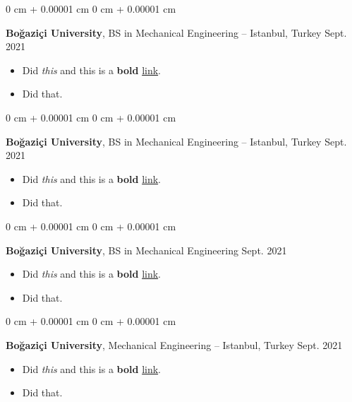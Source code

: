 \documentclass[10pt, letterpaper]{article}
\newenvironment{highlights}{
    \begin{itemize}[
        topsep=0.10 cm,
        parsep=0.10 cm,
        partopsep=0pt,
        itemsep=0pt,
        leftmargin=0 cm + 10pt
    ]
}{
    \end{itemize}
        
    \vspace{-0.20cm}
} %
\newenvironment{onecolentry}{
    \begin{adjustwidth}{
        0 cm + 0.00001 cm
    }{
        0 cm + 0.00001 cm
    }
}{
    \end{adjustwidth}
} %
\begin{document}
        \begin{onecolentry}
            \textbf{Boğaziçi University}, BS in Mechanical Engineering -- Istanbul, Turkey \hfill Sept. 2021
            \begin{highlights}
                \item Did \textit{this} and this is a \textbf{bold} \href{https://example.com}{link}.
                \item Did that.
            \end{highlights}
        \end{onecolentry}

        \vspace{0.1 cm}

        \begin{onecolentry}
            \textbf{Boğaziçi University}, BS in Mechanical Engineering -- Istanbul, Turkey \hfill Sept. 2021
            \begin{highlights}
                \item Did \textit{this} and this is a \textbf{bold} \href{https://example.com}{link}.
                \item Did that.
            \end{highlights}
        \end{onecolentry}

        \vspace{0.1 cm}

        \begin{onecolentry}
            \textbf{Boğaziçi University}, BS in Mechanical Engineering \hfill Sept. 2021
            \begin{highlights}
                \item Did \textit{this} and this is a \textbf{bold} \href{https://example.com}{link}.
                \item Did that.
            \end{highlights}
        \end{onecolentry}

        \vspace{0.1 cm}

        \begin{onecolentry}
            \textbf{Boğaziçi University}, Mechanical Engineering -- Istanbul, Turkey \hfill Sept. 2021
            \begin{highlights}
                \item Did \textit{this} and this is a \textbf{bold} \href{https://example.com}{link}.
                \item Did that.
            \end{highlights}
        \end{onecolentry}
\end{document}
